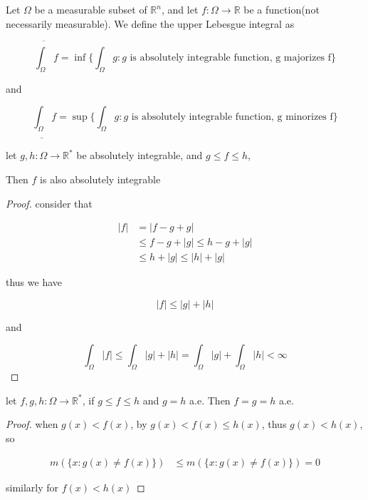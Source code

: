 \begin{definition}
    Let $\Omega$ be a measurable subset of $\mathbb{R}^n$, and let $f: \Omega \to \mathbb{R}$ 
    be a function(not necessarily measurable). We define the  upper Lebesgue integral as

    \[
        \overline{\int_{\Omega}} f = \inf \{ \int_{\Omega}g : g \text{ is absolutely integrable function, g majorizes f}\}
    \]

    and


    \[
        \underline{\int_{\Omega}} f = \sup \{ \int_{\Omega}g : g \text{ is absolutely integrable function, g minorizes f}\}
    \]
\end{definition}

\begin{thm}
    let $g,h : \Omega \to \mathbb{R}^*$ be absolutely integrable, and $g \le f \le h$,

    Then $f$ is also absolutely integrable
\end{thm}

\begin{proof}
    consider that 

    \begin{align*}
        |f| &= |f - g + g| \\
        & \le f-g + |g| \le h-g + |g| \\
        & \le h + |g| \le |h| + |g|
    \end{align*}

    thus we have

    \[
        |f| \le |g| + |h|
    \]

    and

    \[
        \int_{\Omega}|f| \le \int_{\Omega}|g| + |h| = \int_{\Omega}|g| + \int_{\Omega}|h| < \infty
    \]
\end{proof}

\begin{thm}
    let $f,g,h: \Omega \to \mathbb{R}^*$, if $g \le f \le h$ and $g = h$ a.e. Then $f = g = h$ a.e.
\end{thm}

\begin{proof}

    when $g(x) < f(x)$, by $g(x) < f(x) \le h(x)$, thus $g(x) < h(x)$, so

    \begin{align*}
        m(\{x: g(x) \ne f(x)\}) & \le m(\{x: g(x) \ne f(x)\}) = 0
    \end{align*}

    similarly for $f(x) < h(x)$
\end{proof}


